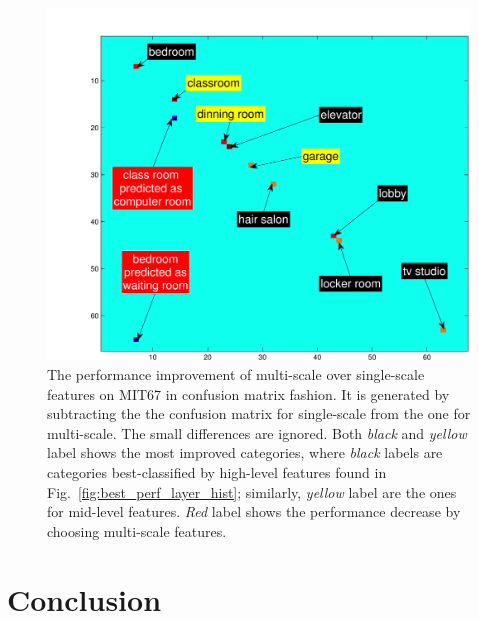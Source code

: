 \documentclass[10pt,twocolumn,letterpaper]{article}
\begin{document}
\begin{figure}[htbp]
\centering
	\includegraphics[width=\columnwidth]{fig/fig_conf_diff.pdf}
\caption{The performance improvement of multi-scale over single-scale features on MIT67 in confusion matrix fashion. It is generated by subtracting the the confusion matrix for single-scale from the one for multi-scale. The small differences are ignored. Both \textit{black} and \textit{yellow} label shows the most improved categories, where \textit{black} labels are categories best-classified by high-level features found in Fig.~\ref{fig:best_perf_layer_hist}; similarly, \textit{yellow} label are the ones for mid-level features. \textit{Red} label shows the performance decrease by choosing multi-scale features.}

\label{fig:conf_diff}
\end{figure}


\section{Conclusion}




{\small


}
\end{document}
